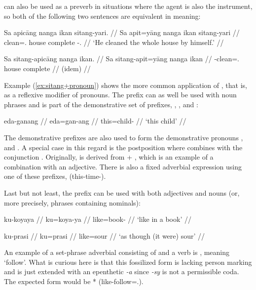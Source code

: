  can also be used as a preverb in situations where the 
agent is also the instrument, so both of the following two sentences are 
equivalent in meaning:

\pex
\a\label{ex:sitang+pronoun}\begingl
	\gla Sa apicāng nanga ikan sitang-yari. //
	\glb Sa apit=yāng nanga ikan sitang-yari //
	\glc \PatT{} clean=\Tsg{}.\Aarg{} house complete 
		\Refl{}-\TsgM{}.\Ins{} //
	\glft `He cleaned the whole house by himself.' //
\endgl

\a\begingl
	\gla Sa sitang-apicāng nanga ikan. //
	\glb Sa sitang-apit=yāng nanga ikan //
	\glc \PatT{} \Refl{}-clean=\Tsg{}.\Aarg{} house complete //
	\glft (idem) //
\endgl
\xe

\label{nounprefixes}
Example (\ref{ex:sitang+pronoun}) shows the more common application of 
, that is, as a reflexive modifier of pronouns. The 
prefix  can as well be used with noun phrases and is part of the 
demonstrative set of prefixes, , , 
and :

\ex\begingl
	\gla eda-ganang //
	\glb eda=gan-ang //
	\glc this=child-\Aarg{} //
	\glft `this child' //
\endgl\xe

The demonstrative prefixes are also used to form the demonstrative 
pronouns , 
 and . A special case 
in this regard is the postposition  where  combines with the conjunction 
. Originally, 
 is derived from  + 
, which is an example of a combination 
with an adjective. There is also a fixed adverbial expression using one of 
these prefixes,  
(this-time-\Dat{}).

Last but not least, the prefix  can be used 
with both adjectives and nouns (or, more precisely, phrases containing 
nominals):

\pex
\a\begingl
	\gla ku-koyaya //
	\glb ku=koya-ya //
	\glc like=book-\Loc{} //
	\glft `like in a book' //
\endgl

\a\begingl
	\gla ku-prasi //
	\glb ku=prasi //
	\glc like=sour //
	\glft `as though (it were) sour' //
\endgl
\xe

An example of a set-phrase adverbial consisting of  and a verb 
is ,  meaning `follow'. 
What is curious here is that this fossilized form is lacking person marking 
and is just extended with an epenthetic \textit{-a} since \textit{-sy} is not 
a permissible coda. The expected form would be 
* (like-follow=\TsgI{}.\Aarg{}).

